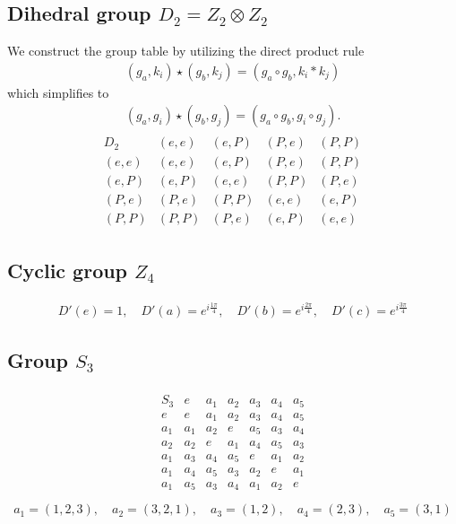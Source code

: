 \documentclass[10pt,a4paper]{article}
\theoremstyle{definition}
\begin{document}
\subsection{Dihedral group \texorpdfstring{$D_2=Z_2\otimes Z_2$}{TEXT}}
We construct the group table by utilizing the direct product rule
\begin{align}
(g_a,k_i)\star(g_b,k_j)=(g_a\circ g_b,k_i*k_j)
\end{align}
which simplifies to
\begin{align}
(g_a,g_i)\star(g_b,g_j)=(g_a\circ g_b,g_i\circ g_j).
\end{align}
\begin{align}
\begin{array}{c||cccc}
D_2   & (e,e) & (e,P) & (P,e) & (P,P) \\ \hline\hline
(e,e) & (e,e) & (e,P) & (P,e) & (P,P) \\
(e,P) & (e,P) & (e,e) & (P,P) & (P,e) \\
(P,e) & (P,e) & (P,P) & (e,e) & (e,P) \\
(P,P) & (P,P) & (P,e) & (e,P) & (e,e)
\end{array}
\end{align}


\subsection{Cyclic group \texorpdfstring{$Z_4$}{TEXT}}
\begin{align}
D'(e)=1,\quad 
D'(a)=e^{i\frac{1\pi}{4}},\quad 
D'(b)=e^{i\frac{2\pi}{4}},\quad 
D'(c)=e^{i\frac{3\pi}{4}}
\end{align}

\subsection{Group \texorpdfstring{$S_3$}{TEXT}}
\begin{align}
\begin{array}{c||cccccc}
S_3 & e   & a_1 & a_2 & a_3 & a_4 & a_5\\ \hline\hline
e   & e   & a_1 & a_2 & a_3 & a_4 & a_5\\
a_1 & a_1 & a_2 & e   & a_5 & a_3 & a_4 \\
a_2 & a_2 & e   & a_1 & a_4 & a_5 & a_3 \\
a_1 & a_3 & a_4 & a_5 & e   & a_1 & a_2 \\
a_1 & a_4 & a_5 & a_3 & a_2 & e   & a_1 \\
a_1 & a_5 & a_3 & a_4 & a_1 & a_2 & e \\
\end{array}
\end{align}
\begin{align}
a_1=(1,2,3),\quad a_2=(3,2,1),\quad a_3=(1,2),\quad a_4=(2,3),\quad a_5=(3, 1) 
\end{align}
\end{document}
